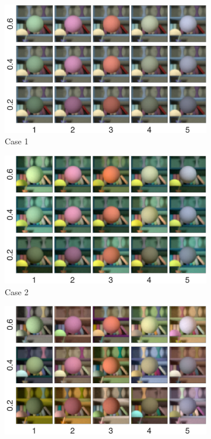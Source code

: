 \documentclass{jov}
\begin{document}
\begin{figure}
\centering
	\begin{subfigure}[b]{0.33 \textwidth}
		\includegraphics[width=\textwidth]{Figure2/targetVarying.jpeg}
		\caption{Case 1}
 		\label{fig:targetVarying}
	\end{subfigure}
	\begin{subfigure}[b]{0.33 \textwidth}
        \includegraphics[width=\textwidth]{Figure2/targetIlluminantVarying.jpeg}
        \caption{Case 2}
        \label{fig:targetIlluminantVarying}
    \end{subfigure}
	\begin{subfigure}[b]{0.33 \textwidth}
        \includegraphics[width=\textwidth]{Figure2/allSpectraVarying.jpeg}

\end{subfigure}
\end{figure}
\end{document}

